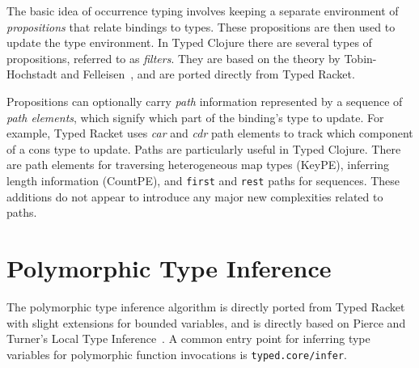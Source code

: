 The basic idea of occurrence typing involves keeping a separate environment of \emph{propositions}
that relate bindings to types. These propositions are then used to update the type environment.
In Typed Clojure there are several types of propositions, referred to as \emph{filters}.
They are based on the theory by Tobin-Hochstadt and Felleisen~\cite{TF10}, and are ported directly
from Typed Racket.



Propositions can optionally carry \emph{path} information
represented by a sequence of \emph{path elements}, which signify which part
of the binding's type to update. For example, Typed Racket uses \emph{car} and \emph{cdr} path elements
to track which component of a cons type to update.
Paths are particularly useful in Typed Clojure. There are path elements for traversing heterogeneous map types (KeyPE),
inferring length information (CountPE), and \lstinline|first| and \lstinline|rest| paths for sequences.
These additions do not appear to introduce any major new complexities related to paths.

\section{Polymorphic Type Inference}

The polymorphic type inference algorithm is directly ported from Typed Racket with slight extensions
for bounded variables,
and is directly based on Pierce and Turner's Local Type Inference~\cite{PT00}.
A common entry point for inferring type variables for polymorphic function invocations
is \lstinline|typed.core/infer|.

